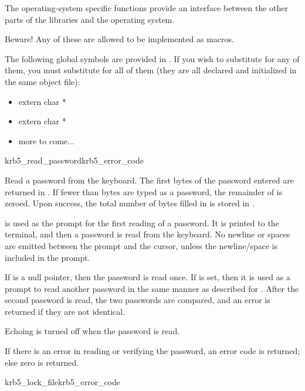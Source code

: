 The operating-system specific functions provide an interface between the
other parts of the  libraries and the operating system.

Beware! Any of these are allowed to be implemented as macros.

The following global symbols are provided in .  If you
wish to substitute for any of them, you must substitute for all of them
(they are all declared and initialized in the same object file):
\begin{itemize}
\item extern char *
\item extern char *
\item more to come...
\end{itemize}

\begin{funcdecl}{krb5_read_password}{krb5_error_code}{\funcin}
\funcout
{}
\funcinout
{}
\end{funcdecl}

Read a password from the keyboard.  The first 
bytes of the password entered are returned in .
If fewer than  bytes are typed as a password,
the remainder of  is zeroed.  Upon success, the
total number of bytes filled in is stored in .

 is used as the prompt for the first reading of a password.
It is printed to the terminal, and then a password is read from the
keyboard.  No newline or spaces are emitted between the prompt and the
cursor, unless the newline/space is included in the prompt.

If  is a null pointer, then the password is read
once.  If  is set, then it is used as a prompt to
read another password in the same manner as described for
.  After the second password is read, the two
passwords are compared, and an error is returned if they are not
identical.

Echoing is turned off when the password is read.

If there is an error in reading or verifying the password, an error code
is returned; else zero is returned.

\begin{funcdecl}{krb5_lock_file}{krb5_error_code}{\funcvoid}
\end{funcdecl}

